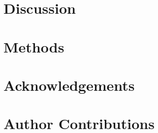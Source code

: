 \documentclass[11pt,a4paper]{article}
\begin{document}
\section*{Discussion}

\section*{Methods}



\section*{Acknowledgements}

\section*{Author Contributions}
\end{document}
